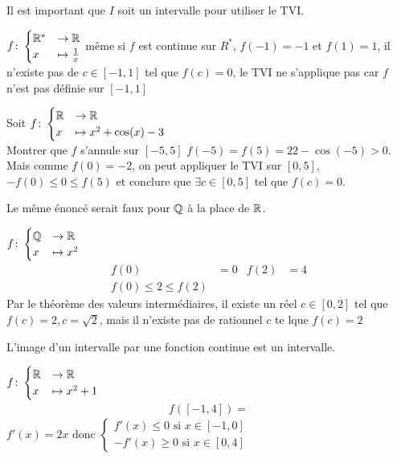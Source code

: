 \begin{remarque}
Il est important que $I$ soit un intervalle pour utiliser le TVI.
\end{remarque}
\begin{exemple}
$
f \colon 
\begin{cases}
\mathbb{R}^* &\to \mathbb{R} \\
x &\mapsto \frac{1}{x}
\end{cases}
$
même si $f$ est continue sur $R^*$, $f(-1) = -1$ et $f(1) = 1$, il n'existe pas de $c \in [-1, 1]$ tel que $f(c) = 0$, le TVI ne s'applique pas car $f$ n'est pas définie sur $[-1, 1]$
\end{exemple}

\begin{exemple}
Soit 
$
f \colon 
\begin{cases}
\mathbb{R} &\to \mathbb{R} \\
x &\mapsto x^2 + \cos(x) -3
\end{cases}
$ 
\\
Montrer que $f$ s'annule sur $[-5, 5]$ $f(-5) = f(5) = 22 -  \cos(-5) > 0 $. \\
Mais comme $f(0) = -2$, on peut appliquer le TVI sur $[0, 5]$, $-f(0) \leq 0 \leq f(5)$ et conclure que $\exists c \in [0, 5]$ tel que $f(c) = 0$.
\end{exemple}

\begin{remarque}
Le même énoncé serait faux pour $\mathbb{Q}$ à la place de $\mathbb{R}$. 
\end{remarque}

\begin{exemple}
$
f \colon 
\begin{cases}
\mathbb{Q} &\to \mathbb{R} \\
x &\mapsto x^2
\end{cases}
$
\begin{align*}
f(0) &= 0 & f(2) &= 4 \\
f(0) \leq 2 \leq f(2)
\end{align*}
Par le théorème des valeurs intermédiaires, il existe un réel $c \in [0, 2]$ tel que $f(c) = 2, c = \sqrt{2}$, mais il n'existe pas de rationnel $c$ te lque $f(c) = 2$
\end{exemple}

\begin{remarque}
L'image d'un intervalle par une fonction continue est un intervalle.
\end{remarque}

\begin{exemple}
$
f \colon
\begin{cases}
\mathbb{R} &\to \mathbb{R} \\
x &\mapsto x^2 + 1
\end{cases}
$
\begin{align*}
f([-1, 4]) =
\end{align*}
$f'(x) = 2x$ donc 
$
\begin{cases}
f'(x) \leq 0 \text{ si } x \in [-1, 0] \\
-f'(x) \geq 0 \text{ si } x \in [0, 4]
\end{cases}
$
\end{exemple}


